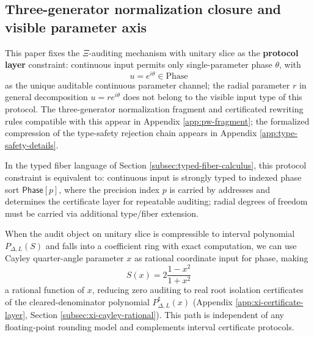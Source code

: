 \subsection{Three-generator normalization closure and visible parameter axis}
\begin{definition}\label{def:unitary-slice-audit-axis}
This paper fixes the $\Xi$-auditing mechanism with unitary slice as the \textbf{protocol layer} constraint: continuous input permits only single-parameter phase $\theta$, with
$$
u=e^{i\theta}\in\mathrm{Phase}
$$
as the unique auditable continuous parameter channel; the radial parameter $r$ in general decomposition $u=re^{i\theta}$ does not belong to the visible input type of this protocol. The three-generator normalization fragment and certificated rewriting rules compatible with this appear in Appendix \ref{app:pw-fragment}; the formalized compression of the type-safety rejection chain appears in Appendix \ref{app:type-safety-details}.\par

In the typed fiber language of Section \ref{subsec:typed-fiber-calculus}, this protocol constraint is equivalent to: continuous input is strongly typed to indexed phase sort $\mathsf{Phase}[p]$, where the precision index $p$ is carried by addresses and determines the certificate layer for repeatable auditing; radial degrees of freedom must be carried via additional type/fiber extension.\par
\end{definition}

\begin{remark}\label{rem:us-rational-audit}
When the audit object on unitary slice is compressible to interval polynomial $P_{\Delta,L}(S)$ and falls into a coefficient ring with exact computation, we can use Cayley quarter-angle parameter $x$ as rational coordinate input for phase, making
$$
S(x)=2\frac{1-x^2}{1+x^2}
$$
a rational function of $x$, reducing zero auditing to real root isolation certificates of the cleared-denominator polynomial $P_{\Delta,L}^\sharp(x)$ (Appendix \ref{app:xi-certificate-layer}, Section \ref{subsec:xi-cayley-rational}). This path is independent of any floating-point rounding model and complements interval certificate protocols.\par
\end{remark}

